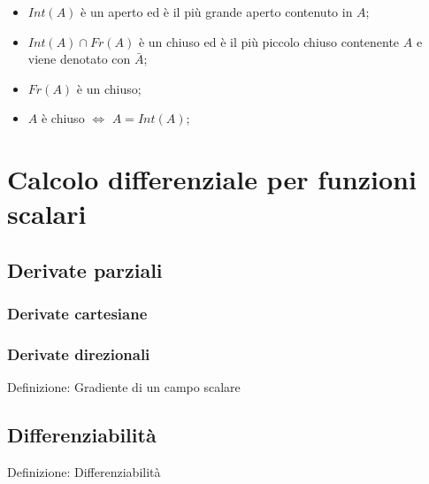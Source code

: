 \documentclass[x11names]{article}
\begin{document}
\begin{itemize}
	\item	\(Int(A)\) è un aperto ed è il più grande aperto contenuto in \(A\);
	\item   \(Int(A) \cap Fr(A)\) è un chiuso ed è il più piccolo chiuso contenente \(A\) e viene denotato con \(\bar{A}\);
	\item   \(Fr(A)\) è un chiuso;
	\item \(A\) è chiuso \(\Longleftrightarrow\) \(A = Int(A)\);
\end{itemize}


\newpage
\section{Calcolo differenziale per funzioni scalari}
	
	
	\subsection{Derivate parziali}
	
		\subsubsection{Derivate cartesiane}
		\subsubsection{Derivate direzionali}

		\begin{center}
		\colorbox{myblue}{\begin{minipage}{5.75in}
			\begin{blues}{Definizione: Gradiente di un campo scalare}
			\end{blues}
		\end{minipage}}       
		\end{center}

	\subsection{Differenziabilità}
		\begin{center}
		\colorbox{myblue}{\begin{minipage}{5.75in}
			\begin{blues}{Definizione: Differenziabilità}
			\end{blues}
		\end{minipage}}       
		\end{center}
\end{document}
